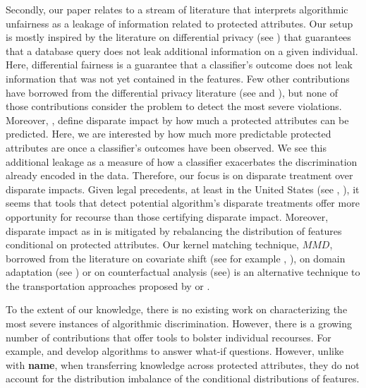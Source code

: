 \documentclass{article}
\begin{document}
 \bigskip
 Secondly, our paper relates to a stream of literature that interprets algorithmic unfairness as a leakage of information related to protected attributes. Our setup is mostly inspired by the literature on differential privacy (see \cite{dwork2014algorithmic}) that guarantees that a database query does not leak additional information on a given individual. Here, differential fairness is a guarantee that a classifier's outcome does not leak information that was not yet contained in the features. Few other contributions have borrowed from the differential privacy literature (see \cite{jagielski2018differentially} and \cite{foulds2018intersectional}), but none of those contributions consider the problem to detect the most severe violations. Moreover, \cite{feldman2015certifying}, \cite{Loubes2018} define disparate impact by how much a protected attributes can be predicted. Here, we are interested by how much more predictable protected attributes are once a classifier's outcomes have been observed. We see this additional leakage as a measure of how a classifier exacerbates the  discrimination already encoded in the data. Therefore, our focus is on disparate treatment over disparate impacts. Given legal precedents, at least in the United States (see \cite{Loomis}, \cite{Ricci}), it seems that tools that detect potential algorithm's disparate treatments offer more opportunity for recourse than those certifying disparate impact. Moreover, disparate impact as in  \cite{feldman2015certifying} is mitigated by rebalancing the distribution of features conditional on protected attributes. Our kernel matching technique, $MMD$, borrowed from the literature on covariate shift (see for example \cite{gretton2009covariate}, \cite{cortes2008sample}), on domain adaptation (see ) or on counterfactual analysis (see) is an alternative technique to the transportation approaches proposed by \cite{feldman2015certifying} or \cite{Loubes2018}.
 
 \bigskip
 To the extent of our knowledge, there is no existing work on characterizing the most severe instances of algorithmic discrimination. However,  there is a growing number of contributions that offer tools to bolster individual recourses. For example,  \cite{ustun2018actionable} and \cite{russell2019efficient} develop algorithms to answer what-if questions. However, unlike with \textbf{name}, when transferring knowledge across protected attributes, they do not account for the distribution imbalance of the conditional distributions of features.    
 
\end{document}
